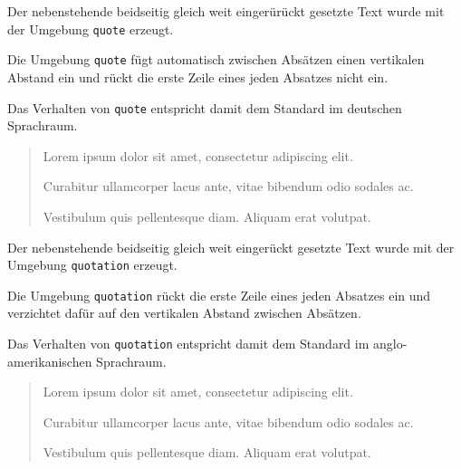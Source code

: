 \documentclass[a4paper,10pt,twoside]{scrbook}
\begin{document}
\begin{minipage}[t]{0.48\textwidth}
\setlength{\parskip}{1em}
\frenchspacing
Der nebenstehende beidseitig gleich weit eingerürückt gesetzte Text wurde mit der Umgebung \verb!quote! erzeugt.


Die Umgebung \verb!quote! fügt automatisch zwischen Absätzen einen vertikalen Abstand ein und rückt die erste Zeile eines jeden Absatzes nicht ein. 

Das Verhalten von \verb!quote! entspricht damit dem Standard im deutschen Sprachraum.
\end{minipage}
\hfill
\begin{minipage}[t]{0.48\textwidth}
\setlength{\parskip}{1em}
\frenchspacing
\begin{quote}
Lorem ipsum dolor sit amet, consectetur adipiscing elit. 

Curabitur ullamcorper lacus ante, vitae bibendum odio sodales ac. 

Vestibulum quis pellentesque diam. Aliquam erat volutpat. 
\end{quote}
\end{minipage}





\begin{minipage}[t]{0.48\textwidth}
\setlength{\parskip}{1em}
\frenchspacing
Der nebenstehende beidseitig gleich weit eingerückt gesetzte Text wurde mit der Umgebung \verb!quotation! erzeugt.


Die Umgebung \verb!quotation! rückt die erste Zeile eines jeden Absatzes ein und verzichtet dafür auf den vertikalen Abstand zwischen Absätzen. 

Das Verhalten von \verb!quotation! entspricht damit dem Standard im anglo-amerikanischen Sprachraum.
\end{minipage}
\hfill
\begin{minipage}[t]{0.48\textwidth}
\setlength{\parskip}{1em}
\frenchspacing
\begin{quotation}
Lorem ipsum dolor sit amet, consectetur adipiscing elit. 

Curabitur ullamcorper lacus ante, vitae bibendum odio sodales ac. 

Vestibulum quis pellentesque diam. Aliquam erat volutpat. 
\end{quotation}
\end{minipage}
\end{document}
